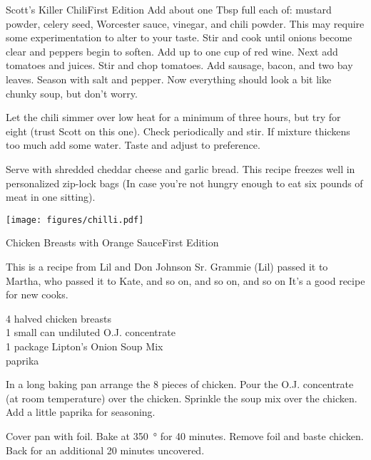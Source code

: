 \begin{entry}{Scott's Killer Chili}{First Edition}
Add about one Tbsp full each of: mustard powder, celery seed, Worcester sauce,
vinegar, and chili powder.  This may require some experimentation to alter to
your taste.  Stir and cook until onions become clear and peppers begin to
soften.  Add up to one cup of red wine.  Next add tomatoes and juices.  Stir
and chop tomatoes.  Add sausage, bacon, and two bay leaves.  Season with salt
and pepper.  Now everything should look a bit like chunky soup, but don't
worry.

Let the chili simmer over low heat for a minimum of three hours, but try for
eight (trust Scott on this one). Check periodically and stir.  If mixture
thickens too much add some water.  Taste and adjust to preference.

Serve with shredded cheddar cheese and garlic bread.  This recipe freezes well
in personalized zip-lock bags (In case you're not hungry enough to eat six
pounds of meat in one sitting).\\
\begin{center}
  \texttt{[image: figures/chilli.pdf]}
\end{center}

\end{entry}

\begin{entry}{Chicken Breasts with Orange Sauce}{First Edition}

\begin{open}
  This is a recipe from Lil and Don Johnson Sr.  Grammie (Lil) passed it to Martha, who passed it to Kate, and so on, and so on, and so on\textellipsis
  It's a good recipe for new cooks.
\end{open}
\begin{ingredients}
  4 halved chicken breasts \\
  1 small can undiluted O.J. concentrate \\
  1 package Lipton's Onion Soup Mix \\
  paprika
\end{ingredients}
In a long baking pan arrange the 8 pieces of chicken.  Pour the O.J.
concentrate (at room temperature) over the chicken.  Sprinkle the soup mix
over the chicken.  Add a little paprika for seasoning.

Cover pan with foil.  Bake at \SI{350}{\degree} for 40 minutes.  Remove foil and
baste chicken.  Back for an additional 20 minutes uncovered.
\end{entry}

